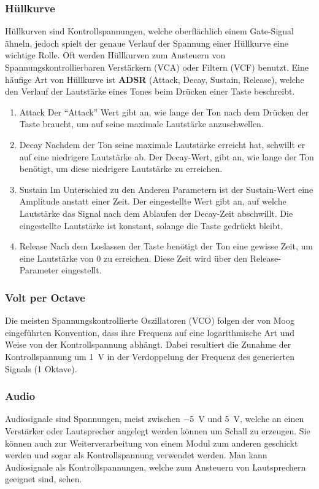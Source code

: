 \subsubsection{Hüllkurve}
\label{sec:orgc0fcdb1}
Hüllkurven sind Kontrollspannungen, welche oberflächlich einem Gate-Signal ähneln, jedoch spielt der genaue Verlauf der Spannung einer Hüllkurve eine wichtige Rolle. Oft werden Hüllkurven zum Ansteuern von Spannungskontrollierbaren Verstärkern (VCA) oder Filtern (VCF) benutzt. Eine häufige Art von Hüllkurve ist \textbf{ADSR} (Attack, Decay, Sustain, Release), welche den Verlauf der Lautstärke eines Tones beim Drücken einer Taste beschreibt.

\begin{enumerate}
\item Attack
\label{sec:orgb4e0a2a}
Der "`Attack"' Wert gibt an, wie lange der Ton nach dem Drücken der Taste braucht, um auf seine maximale Lautstärke anzuschwellen.

\item Decay
\label{sec:orga13cdab}
Nachdem der Ton seine maximale Lautstärke erreicht hat, schwillt er auf eine niedrigere Lautstärke ab. Der Decay-Wert, gibt an, wie lange der Ton benötigt, um diese niedrigere Lautstärke zu erreichen.

\item Sustain
\label{sec:org590cb82}
Im Unterschied zu den Anderen Parametern ist der Sustain-Wert eine Amplitude anstatt einer Zeit. Der eingestellte Wert gibt an, auf welche Lautstärke das Signal nach dem Ablaufen der Decay-Zeit abschwillt. Die eingestellte Lautstärke ist konstant, solange die Taste gedrückt bleibt.

\item Release
\label{sec:org5498de9}
Nach dem Loslassen der Taste benötigt der Ton eine gewisse Zeit, um eine Lautstärke von 0 zu erreichen. Diese Zeit wird über den Release-Parameter eingestellt.
\end{enumerate}


\subsubsection{Volt per Octave}
\label{sec:orged1ab9c}
Die meisten Spannungskontrollierte Oszillatoren (VCO) folgen der von Moog eingeführten Konvention, dass ihre Frequenz auf eine logarithmische Art und Weise von der Kontrollspannung abhängt. Dabei resultiert die Zunahme der Kontrollspannung um \SI{1}{\volt} in der Verdoppelung der Frequenz des generierten Signals (1 Oktave).

\subsubsection{Audio}
\label{sec:org77168a7}
Audiosignale sind Spannungen, meist zwischen \SI{-5}{\volt} und \SI{5}{\volt}, welche an einen Verstärker oder Lautsprecher angelegt werden können um Schall zu erzeugen. Sie können auch zur Weiterverarbeitung von einem Modul zum anderen geschickt werden und sogar als Kontrollspannung verwendet werden. Man kann Audiosignale als Kontrollspannungen, welche zum Ansteuern von Lautsprechern geeignet sind, sehen.
